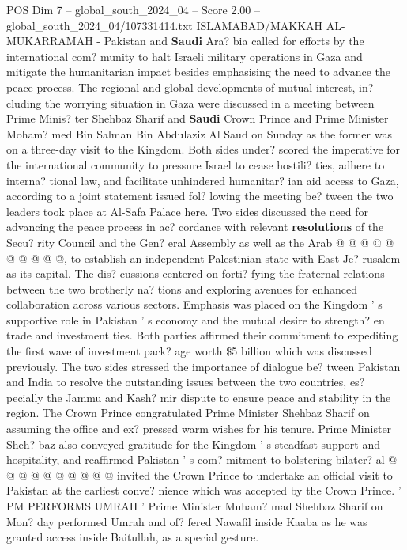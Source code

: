 \begin{textsample}{POS Dim 7 – global\_south\_2024\_04 – Score 2.00 – global\_south\_2024\_04/107331414.txt}  \label{ex:f7_pos_108}
ISLAMABAD/MAKKAH AL-MUKARRAMAH - Pakistan and \textbf{Saudi} Ara? bia called for efforts by the international com? munity to halt Israeli military operations in Gaza and mitigate the humanitarian impact besides emphasising the need to advance the peace process.
The regional and global developments of mutual interest, in? cluding the worrying situation in Gaza were discussed in a meeting between Prime Minis? ter Shehbaz Sharif and \textbf{Saudi} Crown Prince and Prime Minister Moham? med Bin Salman Bin Abdulaziz Al Saud on Sunday as the former was on a three-day visit to the Kingdom.
Both sides under? scored the imperative for the international community to pressure Israel to cease hostili? ties, adhere to interna? tional law, and facilitate unhindered humanitar? ian aid access to Gaza, according to a joint statement issued fol? lowing the meeting be? tween the two leaders took place at Al-Safa Palace here.
Two sides discussed the need for advancing the peace process in ac? cordance with relevant \textbf{resolutions} of the Secu? rity Council and the Gen? eral Assembly as well as the Arab @ @ @ @ @ @ @ @ @ @, to establish an independent Palestinian state with East Je? rusalem as its capital.
The dis? cussions centered on forti? fying the fraternal relations between the two brotherly na? tions and exploring avenues for enhanced collaboration across various sectors.
Emphasis was placed on the Kingdom ' s supportive role in Pakistan ' s economy and the mutual desire to strength? en trade and investment ties.
Both parties affirmed their commitment to expediting the first wave of investment pack? age worth \$5 billion which was discussed previously.
The two sides stressed the importance of dialogue be? tween Pakistan and India to resolve the outstanding issues between the two countries, es? pecially the Jammu and Kash? mir dispute to ensure peace and stability in the region.
The Crown Prince congratulated Prime Minister Shehbaz Sharif on assuming the office and ex? pressed warm wishes for his tenure.
Prime Minister Sheh? baz also conveyed gratitude for the Kingdom ' s steadfast support and hospitality, and reaffirmed Pakistan ' s com? mitment to bolstering bilater? al @ @ @ @ @ @ @ @ @ @ invited the Crown Prince to undertake an official visit to Pakistan at the earliest conve? nience which was accepted by the Crown Prince. ' PM PERFORMS UMRAH ' Prime Minister Muham? mad Shehbaz Sharif on Mon? day performed Umrah and of? fered Nawafil inside Kaaba as he was granted access inside Baitullah, as a special gesture.

\end{textsample}

